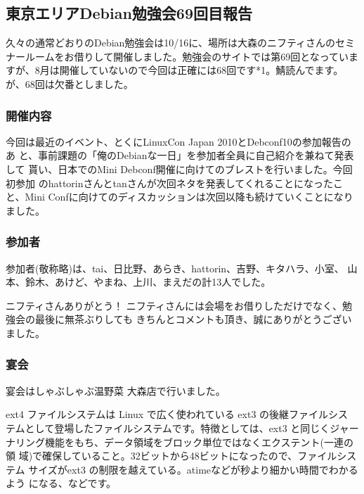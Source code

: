 \documentclass[mingoth,a4paper]{jsarticle}
\begin{document}
\subsection{東京エリアDebian勉強会69回目報告}

久々の通常どおりのDebian勉強会は10/16に、場所は大森のニフティさんのセミ
ナールームをお借りして開催しました。勉強会のサイトでは第69回となっていま
すが、8月は開催していないので今回は正確には68回です*1。鯖読んでます。
が、68回は欠番としました。

\subsubsection{開催内容}
今回は最近のイベント、とくにLinuxCon Japan 2010とDebconf10の参加報告のあ
と、事前課題の「俺のDebianな一日」を参加者全員に自己紹介を兼ねて発表して
貰い、日本でのMini Debconf開催に向けてのブレストを行いました。今回初参加
のhattorinさんとtanさんが次回ネタを発表してくれることになったこと、Mini
Confに向けてのディスカッションは次回以降も続けていくことになりました。

\subsubsection{参加者}
参加者(敬称略)は、tai、日比野、あらき、hattorin、吉野、キタハラ、小室、
山本、鈴木、あけど、やまね、上川、まえだの計13人でした。

ニフティさんありがとう！
ニフティさんには会場をお借りしただけでなく、勉強会の最後に無茶ぶりしても
きちんとコメントも頂き、誠にありがとうございました。

\subsubsection{宴会}
宴会はしゃぶしゃぶ温野菜 大森店で行いました。



ext4 ファイルシステムは Linux で広く使われている ext3 の後継ファイルシス
テムとして登場したファイルシステムです。特徴としては、ext3 と同じくジャー
ナリング機能をもち、データ領域をブロック単位ではなくエクステント(一連の領
域)で確保していること。32ビットから48ビットになったので、ファイルシステム
サイズがext3 の制限を越えている。atimeなどが秒より細かい時間でわかるよう
になる、などです。\cite{ext42007,ext42008}
\end{document}
